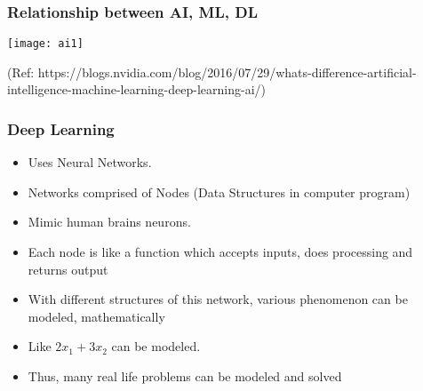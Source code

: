 \begin{frame}[fragile]\frametitle{Relationship between AI, ML, DL}
\begin{center}
\texttt{[image: ai1]}
\end{center}
{\tiny (Ref: https://blogs.nvidia.com/blog/2016/07/29/whats-difference-artificial-intelligence-machine-learning-deep-learning-ai/)}
\end{frame}









\begin{frame}[fragile]\frametitle{Deep Learning}
\begin{itemize}
\item Uses Neural Networks.
\item Networks comprised of Nodes (Data Structures in computer program)
\item Mimic human brains neurons.
\item Each node is like a function which accepts inputs, does processing and returns output
\item With different structures of this network, various phenomenon can be modeled, mathematically
\item Like $2x_1 + 3x_2$ can be modeled.
\item Thus, many real life problems can be modeled and solved
\end{itemize}
\end{frame}

